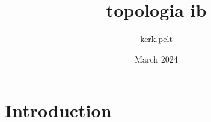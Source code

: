 \documentclass{article}
\title{topologia ib}
\author{kerk.pelt }
\date{March 2024}
\begin{document}
\maketitle

\section{Introduction}
\end{document}
